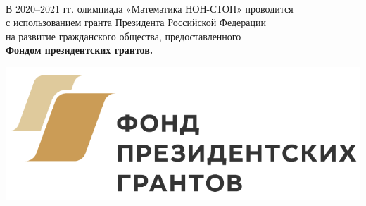 \begin{frame}
	\ \\ [-0.5cm]
	\noindent В 2020–2021 гг. олимпиада «Математика НОН-СТОП» проводится \\
	с использованием гранта Президента Российской Федерации \\
	на развитие гражданского общества, предоставленного \\
	{\bfseries Фондом президентских грантов.}
	
	\vspace{0.45cm}
	\begin{center}
		\includegraphics[scale=0.6]{fpg/fpg}
	\end{center}
\end{frame}